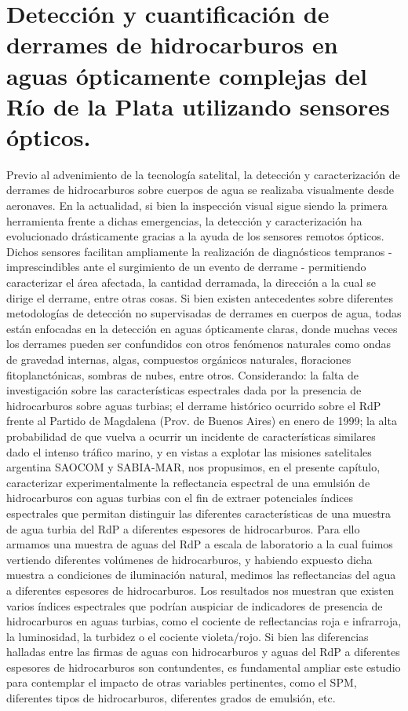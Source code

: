 \chapter[Detección de hidrocarburos en aguas del RdP]{Detección y cuantificación de derrames de hidrocarburos en aguas ópticamente complejas del Río de la Plata utilizando sensores ópticos.}
\label{oil}

Previo al advenimiento de la tecnología satelital, la detección y caracterización de derrames de hidrocarburos sobre cuerpos de agua se realizaba visualmente desde aeronaves. En la actualidad, si bien la inspección visual sigue siendo la primera herramienta frente a dichas emergencias, la detección y caracterización ha evolucionado drásticamente gracias a la ayuda de los sensores remotos ópticos. Dichos sensores facilitan ampliamente la realización de diagnósticos tempranos - imprescindibles ante el surgimiento de un evento de derrame - permitiendo caracterizar el área afectada, la cantidad derramada, la dirección a la cual se dirige el derrame, entre otras cosas.
%
Si bien existen antecedentes sobre diferentes metodologías de detección no supervisadas de derrames en cuerpos de agua, todas están enfocadas en la detección en aguas ópticamente claras, donde muchas veces los derrames pueden ser confundidos con otros fenómenos naturales como ondas de gravedad internas, algas, compuestos orgánicos naturales, floraciones fitoplanctónicas, sombras de nubes, entre otros.
%
Considerando: la falta de investigación sobre las características espectrales dada por la presencia de hidrocarburos sobre aguas turbias; el derrame histórico ocurrido sobre el RdP frente al Partido de Magdalena (Prov. de Buenos Aires) en enero de 1999; la alta probabilidad de que vuelva a ocurrir un incidente de características similares dado el intenso tráfico marino, y en vistas a explotar las misiones satelitales argentina SAOCOM y SABIA-MAR, nos propusimos, en el presente capítulo, caracterizar experimentalmente la reflectancia espectral de una emulsión de hidrocarburos con aguas turbias con el fin de extraer potenciales índices espectrales que permitan distinguir las diferentes características de una muestra de agua turbia del RdP a diferentes espesores de hidrocarburos.
%
Para ello armamos una muestra de aguas del RdP a escala de laboratorio a la cual fuimos vertiendo diferentes volúmenes de hidrocarburos, y habiendo expuesto dicha muestra a condiciones de iluminación natural, medimos las reflectancias del agua a diferentes espesores de hidrocarburos. Los resultados nos muestran que existen varios índices espectrales que podrían auspiciar de indicadores de presencia de hidrocarburos en aguas turbias, como el cociente de reflectancias roja e infrarroja, la luminosidad, la turbidez o el cociente violeta/rojo. Si bien las diferencias halladas entre las firmas de aguas con hidrocarburos y aguas del RdP a diferentes espesores de hidrocarburos son contundentes, es fundamental ampliar este estudio para contemplar el impacto de otras variables pertinentes, como el SPM, diferentes tipos de hidrocarburos, diferentes grados de emulsión, etc.

